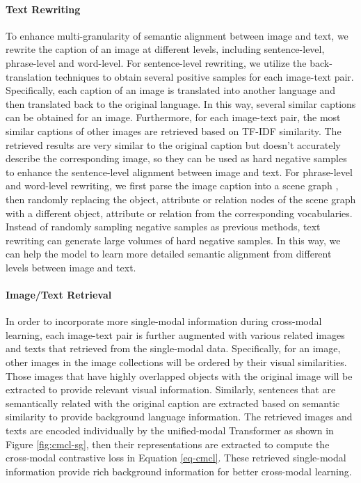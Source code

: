 \documentclass[11pt,a4paper]{article}
\begin{document}
\paragraph{Text Rewriting}
To enhance multi-granularity of semantic alignment between image and text, we rewrite the caption of an image at different levels, including sentence-level, phrase-level and word-level.
For sentence-level rewriting, we utilize the back-translation techniques \citep{edunov-etal-2018-understanding} to obtain several positive samples for each image-text pair.
Specifically, each caption of an image is translated into another language and then translated back to the original language.
In this way, several similar captions can be obtained for an image.
Furthermore, for each image-text pair, the most similar captions of other images are retrieved based on TF-IDF similarity.
The retrieved results are very similar to the original caption but doesn't accurately describe the corresponding image, so they can be used as hard negative samples to enhance the sentence-level alignment between image and text.
For phrase-level and word-level rewriting, we first parse the image caption into a scene graph \citep{wang-etal-2018-scene}, then randomly replacing the object, attribute or relation nodes of the scene graph with a different object, attribute or relation from the corresponding vocabularies.
Instead of randomly sampling negative samples as previous methods, text rewriting can generate large volumes of hard negative samples.
In this way, we can help the model to learn more detailed semantic alignment from different levels between image and text.

\paragraph{Image/Text Retrieval}
In order to incorporate more single-modal information during cross-modal learning, each image-text pair is further augmented with various related images and texts that retrieved from the single-modal data. 
Specifically, for an image, other images in the image collections will be ordered by their visual similarities.
Those images that have highly overlapped objects with the original image will be extracted to provide relevant visual information.
Similarly, sentences that are semantically related with the original caption are extracted based on semantic similarity to provide background language information.
The retrieved images and texts are encoded individually by the unified-modal Transformer as shown in Figure \ref{fig:cmcl-sg}, then their representations are extracted to compute the cross-modal contrastive loss in Equation \ref{eq-cmcl}.
These retrieved single-modal information provide rich background information for better cross-modal learning.
\end{document}
